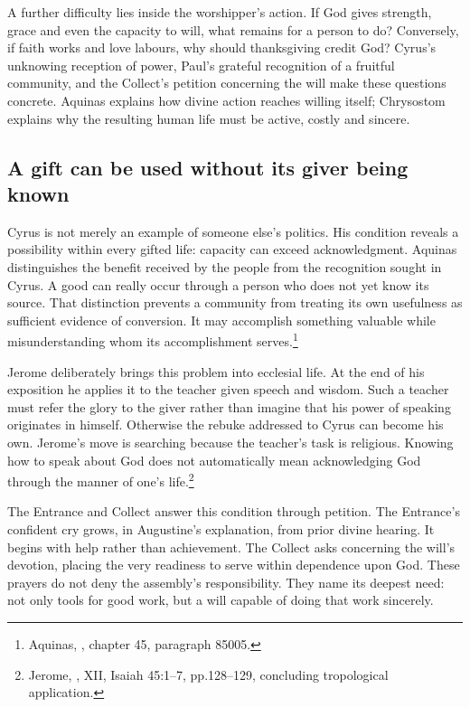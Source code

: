 \clearpage
{}
A further difficulty lies inside the worshipper's action. If God gives strength, grace and even the capacity to will, what remains for a person to do? Conversely, if faith works and love labours, why should thanksgiving credit God? Cyrus's unknowing reception of power, Paul's grateful recognition of a fruitful community, and the Collect's petition concerning the will make these questions concrete. Aquinas explains how divine action reaches willing itself; Chrysostom explains why the resulting human life must be active, costly and sincere.

\subsection{A gift can be used without its giver being known}
Cyrus is not merely an example of someone else's politics. His condition reveals a possibility within every gifted life: capacity can exceed acknowledgment. Aquinas distinguishes the benefit received by the people from the recognition sought in Cyrus. A good can really occur through a person who does not yet know its source. That distinction prevents a community from treating its own usefulness as sufficient evidence of conversion. It may accomplish something valuable while misunderstanding whom its accomplishment serves.\footnote{Aquinas, , chapter 45, paragraph 85005.}

Jerome deliberately brings this problem into ecclesial life. At the end of his exposition he applies it to the teacher given speech and wisdom. Such a teacher must refer the glory to the giver rather than imagine that his power of speaking originates in himself. Otherwise the rebuke addressed to Cyrus can become his own. Jerome's move is searching because the teacher's task is religious. Knowing how to speak about God does not automatically mean acknowledging God through the manner of one's life.\footnote{Jerome, , XII, Isaiah 45:1--7, pp.128--129, concluding tropological application.}

The Entrance and Collect answer this condition through petition. The Entrance's confident cry grows, in Augustine's explanation, from prior divine hearing. It begins with help rather than achievement. The Collect asks concerning the will's devotion, placing the very readiness to serve within dependence upon God. These prayers do not deny the assembly's responsibility. They name its deepest need: not only tools for good work, but a will capable of doing that work sincerely.

